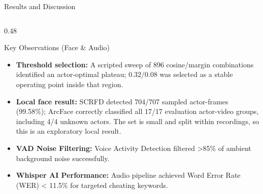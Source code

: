 \documentclass[aspectratio=169, 10pt]{beamer}
\begin{document}
\begin{frame}{Results and Discussion}
\begin{columns}[T]
\begin{column}{0.48\textwidth}
\begin{block}{\textcolor{MLIOTwhite}{Key Observations (Face \& Audio)}}
        \begin{itemize}
          \item \textbf{Threshold selection:} A scripted sweep of 896 cosine/margin combinations identified an actor-optimal plateau; $0.32/0.08$ was selected as a stable operating point inside that region.
          \item \textbf{Local face result:} SCRFD detected 704/707 sampled actor-frames (99.58\%); ArcFace correctly classified all 17/17 evaluation actor-video groups, including 4/4 unknown actors. The set is small and split within recordings, so this is an exploratory local result.
          \item \textbf{VAD Noise Filtering:} Voice Activity Detection filtered >85\% of ambient background noise successfully.
          \item \textbf{Whisper AI Performance:} Audio pipeline achieved Word Error Rate (WER) < 11.5\% for targeted cheating keywords.
        \end{itemize}
      \end{block}
    \end{column}
  \end{columns}
\end{frame}
\end{document}
